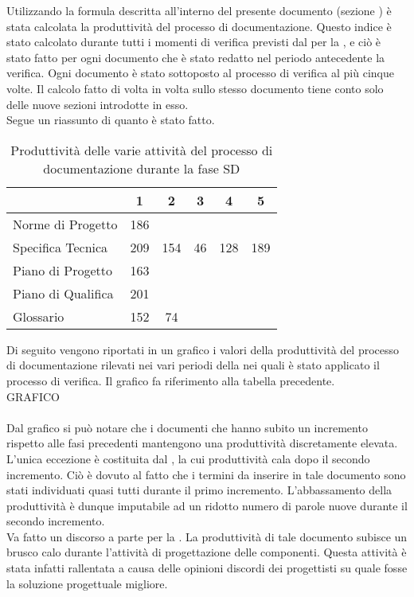 			Utilizzando la formula descritta all'interno del presente documento (sezione ) è stata calcolata la produttività del processo di documentazione. Questo indice è stato calcolato durante tutti i momenti di verifica previsti dal  per	la , e ciò è stato fatto per ogni documento che è stato redatto nel periodo antecedente la verifica. Ogni documento è stato sottoposto al processo di verifica al più cinque volte. Il calcolo fatto di volta in volta sullo stesso documento tiene conto solo delle nuove sezioni introdotte in esso.\\
				Segue un riassunto di quanto è stato fatto.
				\begin{table}[H]
					\centering
					\begin{tabu}{| l | c | c | c | c | c |}
						\hline
							&1	&2	&3	&4	&5	\\ \hline
						Norme di Progetto	& 186 &	&	&	& \\ \hline
						Specifica Tecnica &	209 & 154 & 46	&	128 & 189 \\ \hline
						Piano di Progetto	& 163 &	&	&	& \\ \hline
						Piano di Qualifica	& 201	&	&	&	&\\ \hline
						Glossario & 152 & 74 & & &\\ \hline
					\end{tabu}
					\caption{Produttività delle varie attività del processo di documentazione durante la fase SD}
				\end{table}
				Di seguito vengono riportati in un grafico i valori della produttività del processo di documentazione rilevati nei vari periodi della  nei quali è stato applicato il processo di verifica. Il grafico fa riferimento alla tabella precedente.\\
				GRAFICO\\ \\
				Dal grafico si può notare che i documenti che hanno subito un incremento rispetto alle fasi precedenti mantengono una produttività discretamente elevata. L'unica eccezione è costituita dal , la cui produttività cala dopo il secondo incremento. Ciò è dovuto al fatto che i termini da inserire in tale documento sono stati individuati quasi tutti durante il primo incremento. L'abbassamento della produttività è dunque imputabile ad un ridotto numero di parole nuove durante il secondo incremento.\\
				Va fatto un discorso a parte per la . La produttività di tale documento subisce un brusco calo durante l'attività di progettazione delle componenti. Questa attività è stata infatti rallentata a causa delle opinioni discordi dei progettisti su quale fosse la soluzione progettuale migliore.
			

